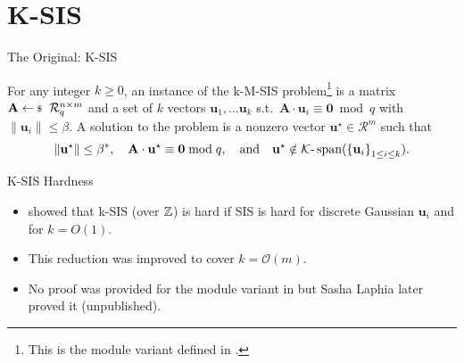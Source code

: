 \documentclass[xcolor=table,10pt,aspectratio=169]{beamer}
\renewcommand{\vec}[1]{\ensuremath{\mathbf{#1}}\xspace}
\providecommand{\mat}[1]{\ensuremath{\vec{#1}}\xspace}
\providecommand{\ring}[0]{\ensuremath{\mathcal{R}}\xspace}
\begin{document}
\section{K-SIS}
\label{sec:org37a73ba}

\begin{frame}[label={sec:org8c8cf06}]{The Original: K-SIS}
\begin{definition}
For any integer \(k \geq 0\), an instance of the k-M-SIS problem\footnote{This is the module variant defined in \cite{C:ACLMT22}.} is a matrix \(\mat{A} \sample \ring_{q}^{n \times m}\) and a set of \(k\) vectors \(\vec{u}_{1}, \ldots \vec{u}_{k}\) s.t. \(\mat{A}\cdot \vec{u}_{i} \equiv \vec{0} \bmod q\) with \(\|{\vec{u}_i}\| \leq \beta\). A solution to the problem is a nonzero vector \(\vec{u}^{\star} \in \ring^{m}\) such that
\[\|{\vec{u}^{\star}}\| \leq \beta^*, \quad \mat{A}\cdot \vec{u}^{\star} \equiv \vec{0} \bmod q,\quad \text{and} \quad \vec{u}^{\star} \notin \mathcal{K}\text{-}\operatorname{span}(\set{\vec{u}_i}_{1 \leq i \le k}).\]
\end{definition}

{\footnotesize {} \par}
\end{frame}

\begin{frame}[label={sec:org10f856d}]{K-SIS Hardness}
\begin{itemize}
\item \cite{PKC:BonFre11} showed that k-SIS (over \(\mathbb{Z}\)) is hard if SIS is hard for discrete Gaussian \(\vec{u}_{i}\) and for \(k = O(1)\).
\item This reduction was improved to cover \(k = \mathcal{O}(m)\).
\item No proof was provided for the module variant in \cite{C:ACLMT22} but Sasha Laphia later proved it (unpublished).
\end{itemize}
\end{frame}
\end{document}

